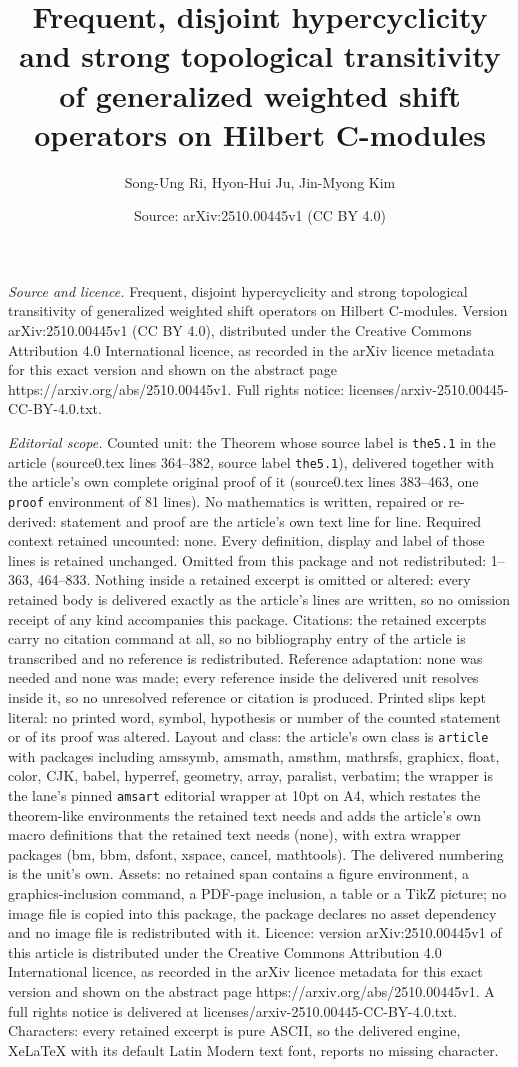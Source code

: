 \documentclass[10pt,a4paper]{amsart}
\title[Frequent, disjoint hypercyclicity and strong topological tra]{Frequent, disjoint hypercyclicity and strong topological transitivity of generalized weighted shift operators on Hilbert C-modules}
\author{Song-Ung Ri, Hyon-Hui Ju, Jin-Myong Kim}
\date{Source: arXiv:2510.00445v1 (CC BY 4.0)}
\begin{document}
\maketitle

\noindent\emph{Source and licence.} Frequent, disjoint hypercyclicity and strong topological transitivity of generalized weighted shift operators on Hilbert C-modules. Version arXiv:2510.00445v1 (CC BY 4.0), distributed under the Creative Commons Attribution 4.0 International licence, as recorded in the arXiv licence metadata for this exact version and shown on the abstract page https://arxiv.org/abs/2510.00445v1. Full rights notice: licenses/arxiv-2510.00445-CC-BY-4.0.txt.\par\smallskip

\noindent\textit{Editorial scope.} Counted unit: the Theorem whose source label is \texttt{the5.1} in the article (source0.tex lines 364--382, source label \texttt{the5.1}), delivered together with the article's own complete original proof of it (source0.tex lines 383--463, one \texttt{proof} environment of 81 lines). No mathematics is written, repaired or re-derived: statement and proof are the article's own text line for line. Required context retained uncounted: none. Every definition, display and label of those lines is retained unchanged. Omitted from this package and not redistributed: 1--363, 464--833. Nothing inside a retained excerpt is omitted or altered: every retained body is delivered exactly as the article's lines are written, so no omission receipt of any kind accompanies this package. Citations: the retained excerpts carry no citation command at all, so no bibliography entry of the article is transcribed and no reference is redistributed. Reference adaptation: none was needed and none was made; every reference inside the delivered unit resolves inside it, so no unresolved reference or citation is produced. Printed slips kept literal: no printed word, symbol, hypothesis or number of the counted statement or of its proof was altered. Layout and class: the article's own class is \texttt{article} with packages including amssymb, amsmath, amsthm, mathrsfs, graphicx, float, color, CJK, babel, hyperref, geometry, array, paralist, verbatim; the wrapper is the lane's pinned \texttt{amsart} editorial wrapper at 10pt on A4, which restates the theorem-like environments the retained text needs and adds the article's own macro definitions that the retained text needs (none), with extra wrapper packages (bm, bbm, dsfont, xspace, cancel, mathtools). The delivered numbering is the unit's own. Assets: no retained span contains a figure environment, a graphics-inclusion command, a PDF-page inclusion, a table or a TikZ picture; no image file is copied into this package, the package declares no asset dependency and no image file is redistributed with it. Licence: version arXiv:2510.00445v1 of this article is distributed under the Creative Commons Attribution 4.0 International licence, as recorded in the arXiv licence metadata for this exact version and shown on the abstract page https://arxiv.org/abs/2510.00445v1. A full rights notice is delivered at licenses/arxiv-2510.00445-CC-BY-4.0.txt. Characters: every retained excerpt is pure ASCII, so the delivered engine, XeLaTeX with its default Latin Modern text font, reports no missing character.
\end{document}
